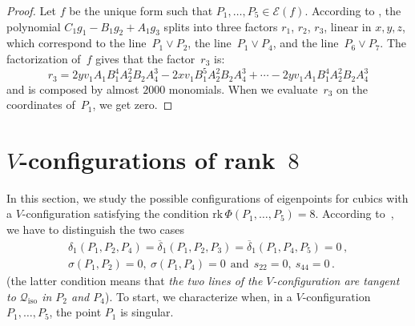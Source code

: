 \documentclass{amsart}
\theoremstyle{plain}
\theoremstyle{definition}
\newcommand{\iso}{\mathcal{Q}_{\mathrm{iso}}}
\newcommand{\Eig}[1]{\mathcal{E}\!\left( {#1} \right)}
\newcommand{\rk}{\ensuremath{\mathrm{rk}}}
\begin{document}
\begin{proof}
Let $f$ be the unique form such that $P_1, \dotsc, P_5 \in \Eig{f}$.
According to , the polynomial
$C_1g_1-B_1g_2+A_1g_3$ splits into three factors $r_1$, $r_2$, $r_3$,
linear in $x, y, z$, which
correspond to the line~$P_1 \vee P_2$, the line~$P_1 \vee P_4$, and the line~$P_6 \vee P_7$.
The factorization of~$f$ gives that the factor~$r_3$ is:
%
\[
  r_3 = 2yv_1A_1B_1^4A_2^2B_2A_4^3-2xv_1B_1^5A_2^2B_2A_4^3+\cdots
  -2 yv_1A_1B_1^4A_2^2B_2A_4^3
\]
%
and is composed by almost $2000$ monomials. When we
evaluate~$r_3$ on the coordinates of~$P_1$, we get zero.
\end{proof}


\section{\texorpdfstring{$V$}{V}-configurations of rank~\texorpdfstring{$8$}{8}}
\label{rank_8}
%
In this section, we study the possible configurations of
eigenpoints for cubics with a $V$-configuration
satisfying the condition $\rk \, \Phi(P_1, \dots, P_5) = 8$. According
to~, we have to distinguish the two cases
%
\begin{gather}
  \delta_1(P_1, P_2, P_4)=\overline{\delta}_1(P_1, P_2, P_3) =
  \overline{\delta}_1(P_1, P_4, P_5) = 0 \,,
  \label{rk8_1} \\
  \sigma(P_1, P_2) = 0, \ \sigma(P_1, P_4) = 0 \ \ \mbox{and} \ \ s_{22} = 0,
  \ s_{44} = 0 \,.
  \label{rk8_2}
\end{gather}
%
(the latter condition means that \emph{the two lines of
the $V$-configuration are tangent to $\iso$ in $P_2$ and $P_4$}).
%
To start, we characterize when, in a $V$-configuration
$P_1, \dotsc, P_5$, the point $P_1$ is singular.
\end{document}
